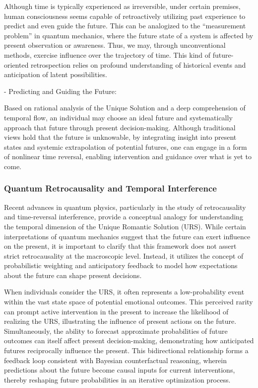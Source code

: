 \documentclass{article}
\begin{document}
Although time is typically experienced as irreversible, under certain premises, human consciousness seems capable of retroactively utilizing past experience to predict and even guide the future. This can be analogized to the “measurement problem” in quantum mechanics, where the future state of a system is affected by present observation or awareness. Thus, we may, through unconventional methods, exercise influence over the trajectory of time. This kind of future-oriented retrospection relies on profound understanding of historical events and anticipation of latent possibilities.

- Predicting and Guiding the Future:

Based on rational analysis of the Unique Solution and a deep comprehension of temporal flow, an individual may choose an ideal future and systematically approach that future through present decision-making. Although traditional views hold that the future is unknowable, by integrating insight into present states and systemic extrapolation of potential futures, one can engage in a form of nonlinear time reversal, enabling intervention and guidance over what is yet to come.

\subsubsection{Quantum Retrocausality and Temporal Interference}

Recent advances in quantum physics, particularly in the study of retrocausality and time-reversal interference, provide a conceptual analogy for understanding the temporal dimension of the Unique Romantic Solution (URS). While certain interpretations of quantum mechanics suggest that the future can exert influence on the present, it is important to clarify that this framework does not assert strict retrocausality at the macroscopic level. Instead, it utilizes the concept of probabilistic weighting and anticipatory feedback to model how expectations about the future can shape present decisions.

When individuals consider the URS, it often represents a low-probability event within the vast state space of potential emotional outcomes. This perceived rarity can prompt active intervention in the present to increase the likelihood of realizing the URS, illustrating the influence of present actions on the future. Simultaneously, the ability to forecast approximate probabilities of future outcomes can itself affect present decision-making, demonstrating how anticipated futures reciprocally influence the present. This bidirectional relationship forms a feedback loop consistent with Bayesian counterfactual reasoning, wherein predictions about the future become causal inputs for current interventions, thereby reshaping future probabilities in an iterative optimization process.
\end{document}
